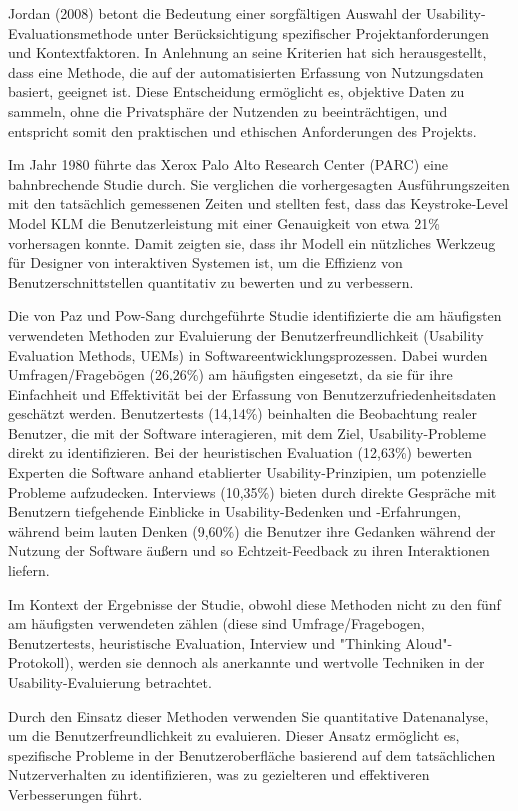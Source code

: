 \documentclass[12pt,oneside]{article}
\begin{document}
Jordan (2008)\cite{jordan2008auswahl} betont die Bedeutung einer sorgfältigen Auswahl der Usability-Evaluationsmethode unter Berücksichtigung spezifischer Projektanforderungen und Kontextfaktoren. In Anlehnung an seine Kriterien hat sich herausgestellt, dass eine Methode, die auf der automatisierten Erfassung von Nutzungsdaten basiert, geeignet ist. Diese Entscheidung ermöglicht es, objektive Daten zu sammeln, ohne die Privatsphäre der Nutzenden zu beeinträchtigen, und entspricht somit den praktischen und ethischen Anforderungen des Projekts.

Im Jahr 1980 führte das Xerox Palo Alto Research Center (PARC)\cite{keystroke} eine bahnbrechende Studie durch. Sie verglichen die vorhergesagten Ausführungszeiten mit den tatsächlich gemessenen Zeiten und stellten fest, dass das Keystroke-Level Model  KLM die Benutzerleistung mit einer Genauigkeit von etwa 21\% vorhersagen konnte. Damit zeigten sie, dass ihr Modell ein nützliches Werkzeug für Designer von interaktiven Systemen ist, um die Effizienz von Benutzerschnittstellen quantitativ zu bewerten und zu verbessern.


Die von Paz und Pow-Sang durchgeführte Studie \cite{Paz2016} identifizierte die am häufigsten verwendeten Methoden zur Evaluierung der Benutzerfreundlichkeit (Usability Evaluation Methods, UEMs) in Softwareentwicklungsprozessen. Dabei wurden Umfragen/Fragebögen (26,26\%) am häufigsten eingesetzt, da sie für ihre Einfachheit und Effektivität bei der Erfassung von Benutzerzufriedenheitsdaten geschätzt werden. Benutzertests (14,14\%) beinhalten die Beobachtung realer Benutzer, die mit der Software interagieren, mit dem Ziel, Usability-Probleme direkt zu identifizieren. Bei der heuristischen Evaluation (12,63\%) bewerten Experten die Software anhand etablierter Usability-Prinzipien, um potenzielle Probleme aufzudecken. Interviews (10,35\%) bieten durch direkte Gespräche mit Benutzern tiefgehende Einblicke in Usability-Bedenken und -Erfahrungen, während beim lauten Denken (9,60\%) die Benutzer ihre Gedanken während der Nutzung der Software äußern und so Echtzeit-Feedback zu ihren Interaktionen liefern.

Im Kontext der Ergebnisse der Studie, obwohl diese Methoden nicht zu den fünf am häufigsten verwendeten zählen (diese sind Umfrage/Fragebogen, Benutzertests, heuristische Evaluation, Interview und "Thinking Aloud"-Protokoll), werden sie dennoch als anerkannte und wertvolle Techniken in der Usability-Evaluierung betrachtet.

Durch den Einsatz dieser Methoden verwenden Sie quantitative Datenanalyse, um die Benutzerfreundlichkeit zu evaluieren. Dieser Ansatz ermöglicht es, spezifische Probleme in der Benutzeroberfläche basierend auf dem tatsächlichen Nutzerverhalten zu identifizieren, was zu gezielteren und effektiveren Verbesserungen führt.
\end{document}
